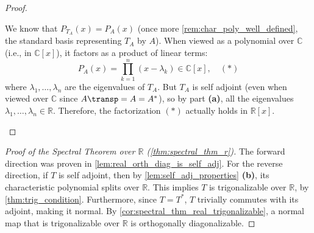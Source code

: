 \begin{proof}
\begin{enumerate}[label=\textbf{(\alph*)}]
    We know that $P_{T_A}(x) = P_A(x)$ (once more \cref{rem:char_poly_well_defined}, the standard basis representing $T_A$ by $A$). When viewed as a polynomial over $\mathbb{C}$ (i.e., in $\mathbb{C}[x]$), it factors as a product of linear terms:
    \[
        P_A(x) = \prod_{k=1}^n (x - \lambda_k) \in \mathbb{C}[x], \quad (*)
    \]
    where $\lambda_1, \dots, \lambda_n$ are the eigenvalues of $T_A$. But $T_A$ is self adjoint (even when viewed over $\mathbb{C}$ since $A\transp = A = A^*$), so by part \textbf{(a)}, all the eigenvalues $\lambda_1, \dots, \lambda_n \in \mathbb{R}$. Therefore, the factorization $(*)$ actually holds in $\mathbb{R}[x]$.
\end{enumerate}
\end{proof}

\begin{proof}[Proof of the Spectral Theorem over $\mathbb{R}$ (\cref{thm:spectral_thm_r})]
The forward direction was proven in \cref{lem:real_orth_diag_is_self_adj}. For the reverse direction, if $T$ is self adjoint, then by \cref{lem:self_adj_properties} \textbf{(b)}, its characteristic polynomial splits over $\mathbb{R}$. This implies $T$ is trigonalizable over $\mathbb{R}$, by \cref{thm:trig_condition}. Furthermore, since $T = T^*$, $T$ trivially commutes with its adjoint, making it normal. By \cref{cor:spectral_thm_real_trigonalizable}, a normal map that is trigonalizable over $\mathbb{R}$ is orthogonally diagonalizable.
\end{proof}

